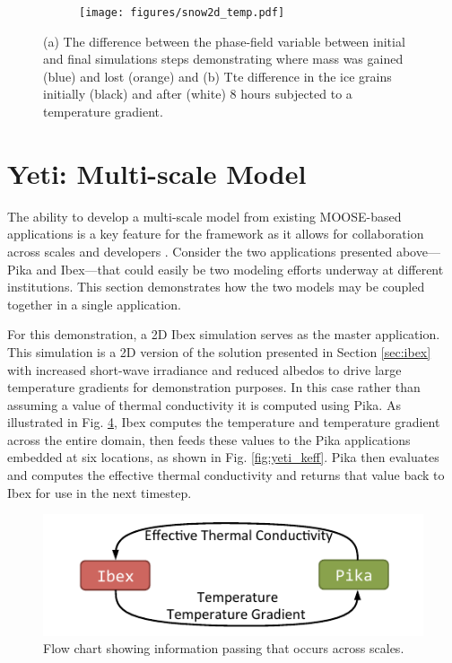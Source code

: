 \begin{figure}
\begin{subfigure}{0.44\linewidth}
  \caption{}
  \label{fig:snow2d:diff}
\end{subfigure}
\hfill
\begin{subfigure}{0.53\linewidth}
  \texttt{[image: figures/snow2d\_temp.pdf]}
  \caption{}
  \label{fig:snow2d:grains}
\end{subfigure}
\caption{(a) The difference between the phase-field variable between initial and final simulations steps demonstrating where mass was gained (blue) and lost (orange) and (b) Tte difference in the ice grains initially (black) and after (white) 8 hours subjected to a  temperature gradient.}
\end{figure}


\section{Yeti: Multi-scale Model}\label{sec:yeti}
The ability to develop a multi-scale model from existing MOOSE-based applications is a key feature for the framework as it allows for collaboration across scales and developers \citep{gaston2014physics}. Consider the two applications presented above---Pika and Ibex---that could easily be two modeling efforts underway at different institutions. This section demonstrates how the two models may be coupled together in a single application.

For this demonstration, a 2D Ibex simulation serves as the master application. This simulation is a 2D version of the solution presented in Section \ref{sec:ibex} with increased short-wave irradiance and reduced albedos to drive large temperature gradients for demonstration purposes. In this case rather than assuming a value of thermal conductivity it is computed using Pika. As illustrated in Fig. \ref{fig:yeti_flow}, Ibex computes the temperature and temperature gradient across the entire domain, then feeds these values to the Pika applications embedded at six locations, as shown in Fig. \ref{fig:yeti_keff}. Pika then evaluates and computes the effective thermal conductivity and returns that value back to Ibex for use in the next timestep.

\begin{figure}[b]
  \includegraphics[width=\linewidth]{figures/flow.pdf}
  \caption{Flow chart showing information passing that occurs across scales.}
  \label{fig:yeti_flow}
\end{figure}

